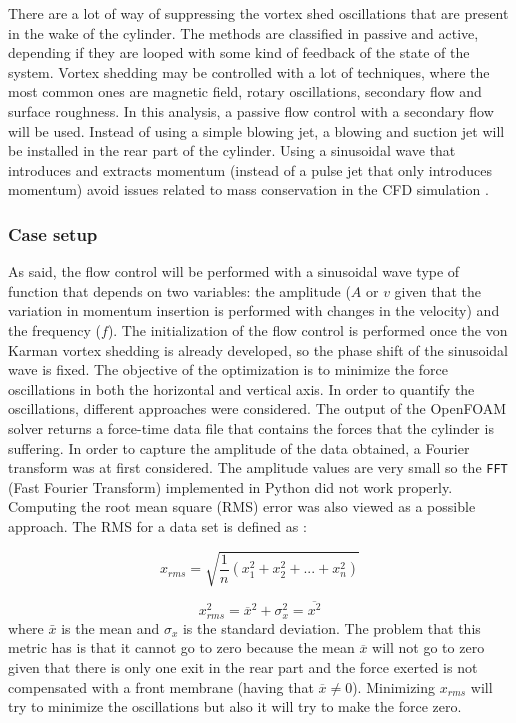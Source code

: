 \newpage

There are a lot of way of suppressing the vortex shed oscillations that are present in the wake of the cylinder. The methods are classified in passive and active, depending if they are looped with some kind of feedback of the state of the system. Vortex shedding may be controlled with a lot of techniques, where the most common ones are magnetic field, rotary oscillations, secondary flow and surface roughness. In this analysis, a passive flow control with a secondary flow will be used. Instead of using a simple blowing jet, a blowing and suction jet will be installed in the rear part of the cylinder. Using a sinusoidal wave that introduces and extracts momentum (instead of a pulse jet that only introduces momentum) avoid issues related to mass conservation in the CFD simulation \cite{rashidi2016vortex}.

\subsubsection*{Case setup}

As said, the flow control will be performed with a sinusoidal wave type of function that depends on two variables: the amplitude ($A$ or $v$ given that the variation in momentum insertion is performed with changes in the velocity) and the frequency ($f$). The initialization of the flow control is performed once the von Karman vortex shedding is already developed, so the phase shift of the sinusoidal wave is fixed. The objective of the optimization is to minimize the force oscillations in both the horizontal and vertical axis. In order to quantify the oscillations, different approaches were considered. The output of the OpenFOAM solver returns a force-time data file that contains the forces that the cylinder is suffering. In order to capture the amplitude of the data obtained, a Fourier transform was at first considered. The amplitude values are very small so the \texttt{FFT} (Fast Fourier Transform) implemented in Python did not work properly. Computing the root mean square (RMS) error was also viewed as a possible approach. The RMS for a data set is defined as \cite{bissell1992digital}:

\begin{equation}
    x_{rms}=\sqrt{\dfrac{1}{n}\left( x_1^2 + x_2^2 + ... + x_n^2 \right)}
\end{equation}

\begin{equation}
    x_{rms}^2=\overline{x}^2+\sigma_x^2=\overline{x^2}
\end{equation} 
where $\bar{x}$ is the mean and $\sigma_x$ is the standard deviation. The problem that this metric has is that it cannot go to zero because the mean $\overline{x}$ will not go to zero given that there is only one exit in the rear part and the force exerted is not compensated with a front membrane (having that $\overline{x}\neq 0$). Minimizing $x_{rms}$ will try to minimize the oscillations but also it will try to make the force zero. 

